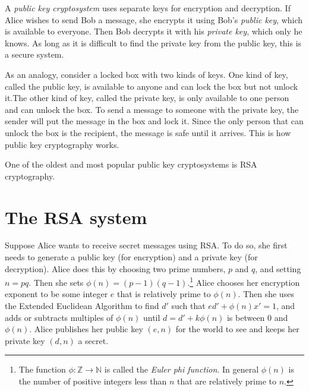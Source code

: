 \label{lab:RSA}


A \emph{public key cryptosystem} uses separate keys for encryption and decryption.
If Alice wishes to send Bob a message, she encrypts it using Bob's \emph{public key}, which is available to everyone.
Then Bob decrypts it with his \emph{private key}, which only he knows.
As long as it is difficult to find the private key from the public key, this is a secure system.


As an analogy, consider a locked box with two kinds of keys.
One kind of key, called the public key, is available to anyone and can lock the box but not unlock it.The other kind of key, called the private key, is only available to one person and can unlock the box.
To send a message to someone with the private key, the sender will put the message in the box and lock it.
Since the only person that can unlock the box is the recipient, the message is safe until it arrives. This is how public key cryptography works.

One of the oldest and most popular public key cryptosystems is RSA cryptography.\\


\section*{The RSA system}
Suppose Alice wants to receive secret messages using RSA.
To do so, she first needs to generate a public key (for encryption) and a private key (for decryption).
Alice does this by choosing two prime numbers, $p$ and $q$, and setting $n=pq$.
Then she sets $\phi(n) = (p-1)(q-1)$.\footnote{
The function $\phi: \mathbb{Z} \rightarrow \mathbb{N}$ is called the \emph{Euler phi function}. In general $\phi(n)$ is the number of positive integers less than $n$ that are relatively prime to $n$.}
Alice chooses her encryption exponent to be some integer $e$ that is relatively prime to $\phi(n)$.
Then she uses the Extended Euclidean Algorithm to find $d'$ such that $ed' + \phi(n)x' = 1$, and adds or subtracts multiples of $\phi(n)$ until $d = d'+k\phi(n)$ is between 0 and $\phi(n)$.
Alice publishes her public key $(e, n)$ for the world to see and keeps her private key $(d,n)$ a secret.

